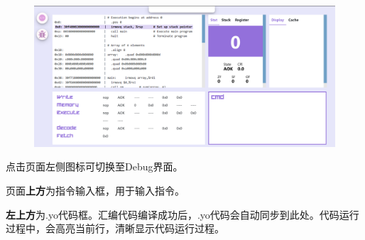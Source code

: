 \documentclass[12pt]{article} %
\begin{document}
\begin{sloppypar}
\begin{figure}[htbp]
\begin{center}
\includegraphics[width=\linewidth]{asset/6.png}
\end{center}
\end{figure}

点击页面左侧图标可切换至Debug界面。


页面{\bf 上方}为指令输入框，用于输入指令。


{\bf 左上方}为.yo代码框。汇编代码编译成功后，.yo代码会自动同步到此处。代码运行过程中，会高亮当前行，清晰显示代码运行过程。

%


\end{sloppypar}
\end{document}
